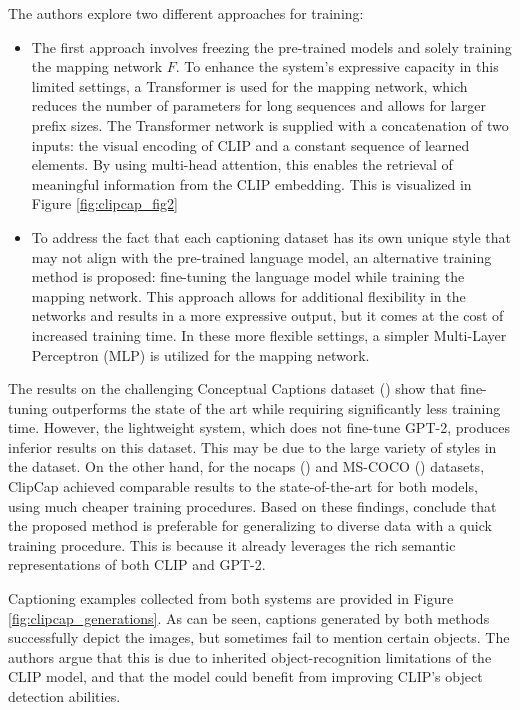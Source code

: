 \documentclass{article}
\begin{document}
\medskip
\noindent
The authors explore two different approaches for training:
\begin{itemize}
    \item
        The first approach involves freezing the pre-trained models and solely training the mapping network $F$. To enhance the system's expressive capacity in this limited settings, a Transformer is used for the mapping network, which reduces the number of parameters for long sequences and allows for larger prefix sizes. The Transformer network is supplied with a concatenation of two inputs: the visual encoding of CLIP and a constant sequence of learned elements. By using multi-head attention, this enables the retrieval of meaningful information from the CLIP embedding. This is visualized in Figure \ref{fig:clipcap_fig2}
    \item
        To address the fact that each captioning dataset has its own unique style that may not align with the pre-trained language model, an alternative training method is proposed: fine-tuning the language model while training the mapping network. This approach allows for additional flexibility in the networks and results in a more expressive output, but it comes at the cost of increased training time. In these more flexible settings, a simpler Multi-Layer Perceptron (MLP) is utilized for the mapping network.
\end{itemize}

\medskip
\noindent
The results on the challenging Conceptual Captions dataset (\citet{conceptualcaptions}) show that fine-tuning outperforms the state of the art while requiring significantly less training time. However, the lightweight system, which does not fine-tune GPT-2, produces inferior results on this dataset. This may be due to the large variety of styles in the dataset. On the other hand, for the nocaps (\citet{nocaps}) and MS-COCO (\citet{lin2014mscoco}) datasets, ClipCap achieved comparable results to the state-of-the-art for both models, using much cheaper training procedures. Based on these findings, \citet{mokady2021clipcap} conclude that the proposed method is preferable for generalizing to diverse data with a quick training procedure. This is because it already leverages the rich semantic representations of both CLIP and GPT-2.

\medskip
\noindent
Captioning examples collected from both systems are provided in Figure \ref{fig:clipcap_generations}. As can be seen, captions generated by both methods successfully depict the images, but sometimes fail to mention certain objects. The authors argue that this is due to inherited object-recognition limitations of the CLIP model, and that the model could benefit from improving CLIP's object detection abilities.
\end{document}
